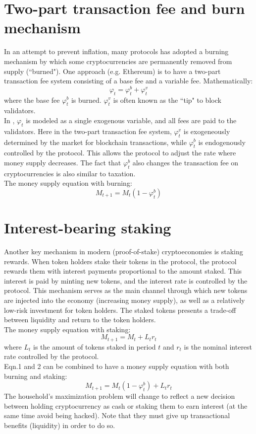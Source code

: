 \documentclass[12pt]{article}
\begin{document}
\section{Two-part transaction fee and burn mechanism}
In an attempt to prevent inflation, many protocols has adopted a burning mechanism by which some cryptocurrencies are permanently removed from supply (``burned"). One approach (e.g. Ethereum) is to have a two-part transaction fee system consisting of a base fee and a variable fee. Mathematically:
\[\varphi_t = \varphi^b_t + \varphi^v_t\]
where the base fee $\varphi^b_t$ is burned. $\varphi^v_t$ is often known as the ``tip" to block validators.\\
In \cite{biais2020equilibrium}, $\varphi_t$ is modeled as a single exogenous variable, and all fees are paid to the validators. Here in the two-part transaction fee system, $\varphi_t^v$ is exogeneously determined by the market for blockchain transactions, while $\varphi_t^b$ is endogenously controlled by the protocol. This allows the protocol to adjust the rate where money supply decreases. The fact that $\varphi^b_t$ also changes the transaction fee on cryptocurrencies is also similar to taxation.\\
The money supply equation with burning:
\begin{equation}
    M_{t+1} = M_t (1 - \varphi^b_t)
\end{equation}


\section{Interest-bearing staking}
Another key mechanism in modern (proof-of-stake) cryptoeconomies is staking rewards. When token holders stake their tokens in the protocol, the protocol rewards them with interest payments proportional to the amount staked. This interest is paid by minting new tokens, and the interest rate is controlled by the protocol. This mechanism serves as the main channel through which new tokens are injected into the economy (increasing money supply), as well as a relatively low-risk investment for token holders. The staked tokens presents a trade-off between liquidity and return to the token holders.\\
The money supply equation with staking:
\begin{equation}
    M_{t+1} = M_t + L_t r_t
\end{equation}
where $L_t$ is the amount of tokens staked in period $t$ and $r_t$ is the nominal interest rate controlled by the protocol.\\
Eqn.1 and 2 can be combined to have a money supply equation with both burning and staking:
\begin{equation}
    M_{t+1} = M_t (1 - \varphi^b_t) + L_t r_t
\end{equation}
The household's maximization problem will change to reflect a new decision between holding cryptocurrency as cash or staking them to earn interest (at the same time avoid being hacked). Note that they must give up transactional benefits (liquidity) in order to do so.
\end{document}
